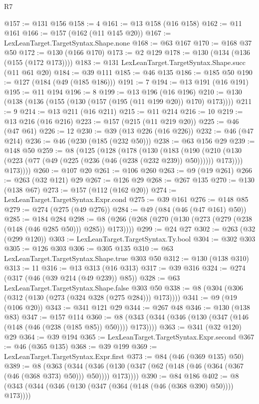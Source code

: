 \begin{lexlean}{R7}
\begin{coremodule}
{{{{{{{{{{{{{{{{{{{{@157 := @131 @156
@158 := 4
@161 := @13 @158 (@16 @158)
@162 := @11 @161
@166 := @157 (@162 (@11 @145 @20))
@167 := LexLeanTarget.TargetSyntax.Shape.none
@168 := @63 @167
@170 := @168 @37 @50
@172 := @130 (@166 @170)
@173 := @2 @129
@178 := @130 (@134 (@136 (@155 (@172 @173))))
@183 := @131 LexLeanTarget.TargetSyntax.Shape.succ (@11 @61 @20)
@184 := @39 @111
@185 := @46 @135
@186 := @185 @50
@190 := @127 (@184 (@49 (@185 @186)))
@191 := 7
@194 := @13 @191 (@16 @191)
@195 := @11 @194
@196 := 8
@199 := @13 @196 (@16 @196)
@210 := @130 (@138 (@136 (@155 (@130 (@157 (@195 (@11 @199 @20)) @170) @173))))
@211 := 9
@214 := @13 @211 (@16 @211)
@215 := @11 @214
@216 := 10
@219 := @13 @216 (@16 @216)
@223 := @157 (@215 (@11 @219 @20))
@225 := @46 (@47 @61)
@226 := 12
@230 := @39 (@13 @226 (@16 @226))
@232 := @46 (@47 @214)
@236 := @46 (@230 (@185 (@232 @50)))
@238 := @63 @156 @29
@239 := @148 @50
@259 := @8
    (@125
      (@128
        (@178
          (@130
            (@183
              (@190
                (@210 (@130 (@223 (@77 (@49 (@225 (@236 (@46 (@238 (@232 @239)) @50)))))) @173))))
            @173))))
@260 := @107 @20
@261 := @106 @260
@263 := @9 (@19 @261)
@266 := @263 (@32 @121) @29
@267 := @126 @29
@268 := @267 @135
@270 := @130 (@138 @67)
@273 := @157 (@112 (@162 @20))
@274 := LexLeanTarget.TargetSyntax.Expr.cond
@275 := @39 @161
@276 := @148 @85
@279 := @274 (@275 (@49 @276))
@284 := @49 (@84 (@46 (@47 @161) @50))
@285 := @184 @284
@298 := @8 (@266 (@268 (@270 (@130 (@273 (@279 (@238 (@148 (@46 @285 @50))) @285)) @173))))
@299 := @24 @27
@302 := @263 (@32 (@299 @120))
@303 := LexLeanTarget.TargetSyntax.Ty.bool
@304 := @302 @303
@305 := @126 @303
@306 := @305 @135
@310 := @63 LexLeanTarget.TargetSyntax.Shape.true @303 @50
@312 := @130 (@138 @310)
@313 := 11
@316 := @13 @313 (@16 @313)
@317 := @39 @316
@324 := @274 (@317 (@46 (@39 @214 (@49 @239)) @85))
@328 := @63 LexLeanTarget.TargetSyntax.Shape.false @303 @50
@338 := @8 (@304 (@306 (@312 (@130 (@273 (@324 @328 (@275 @284))) @173))))
@341 := @9 (@19 (@106 @20))
@343 := @341 @121 @29
@344 := @267 @48
@346 := @130 (@138 @83)
@347 := @157 @114
@360 := @8 (@343 (@344 (@346 (@130 (@347 (@146 (@148 (@46 (@238 (@185 @85)) @50)))) @173))))
@363 := @341 (@32 @120) @29
@364 := @39 @194
@365 := LexLeanTarget.TargetSyntax.Expr.second
@367 := @46 (@365 @135)
@368 := @39 @199
@369 := LexLeanTarget.TargetSyntax.Expr.first
@373 := @84 (@46 (@369 @135) @50)
@389 := @8
    (@363
      (@344 (@346 (@130 (@347 (@62 (@148 (@46 (@364 (@367 (@46 (@368 @373) @50))) @50)))) @173))))
@390 := @84 @186
@402 := @8 (@343 (@344 (@346 (@130 (@347 (@364 (@148 (@46 (@368 @390) @50)))) @173))))
}}}}}}}}}}}}}}}}}}}}
\end{coremodule}
\end{lexlean}
